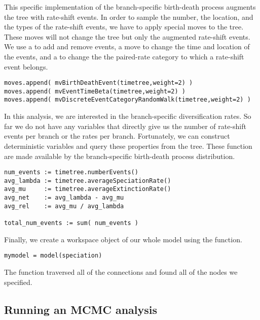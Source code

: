 This specific implementation of the branch-specific birth-death process augments the tree with rate-shift events.
In order to sample the number, the location, and the types of the rate-shift events, we have to apply special moves to the tree.
These moves will not change the tree but only the augmented rate-shift events.
We use a  to add and remove events, a  move to change the time and location of the events,
and a  to change the the paired-rate category to which a rate-shift event belongs.
{\tt \begin{snugshade*}
\begin{lstlisting}
moves.append( mvBirthDeathEvent(timetree,weight=2) )
moves.append( mvEventTimeBeta(timetree,weight=2) )
moves.append( mvDiscreteEventCategoryRandomWalk(timetree,weight=2) )
\end{lstlisting}
\end{snugshade*}}

In this analysis, we are interested in the branch-specific diversification rates.
So far we do not have any variables that directly give us the number of rate-shift events per branch or the rates per branch.
Fortunately, we can construct deterministic variables and query these properties from the tree.
These function are made available by the branch-specific birth-death process distribution.
{\tt \begin{snugshade*}
\begin{lstlisting}
num_events := timetree.numberEvents()
avg_lambda := timetree.averageSpeciationRate()
avg_mu     := timetree.averageExtinctionRate()
avg_net    := avg_lambda - avg_mu
avg_rel    := avg_mu / avg_lambda

total_num_events := sum( num_events )
\end{lstlisting}
\end{snugshade*}}


Finally, we create a workspace object of our whole model using the  function.
{\tt \begin{snugshade*}
\begin{lstlisting}
mymodel = model(speciation)
\end{lstlisting}
\end{snugshade*}}

The  function traversed all of the connections and found all of the nodes we specified.


\subsection{Running an MCMC analysis}

